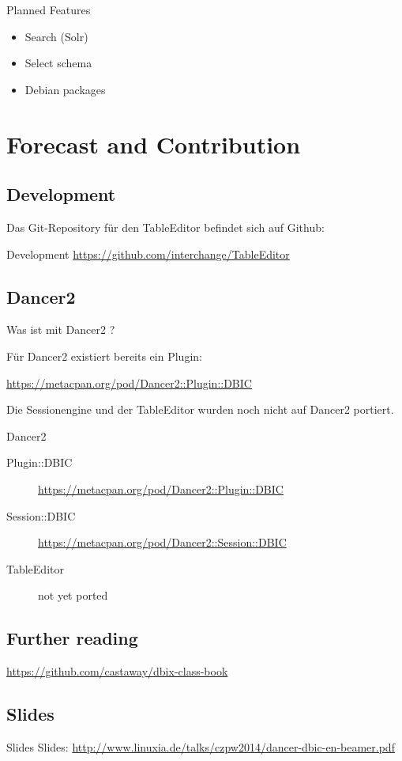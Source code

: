 \begin{frame}{Planned Features}
\begin{itemize}
\item Search (Solr)
\item Select schema
\item Debian packages
\end{itemize}
\end{frame}


\section{Forecast and Contribution}

\subsection{Development}

Das Git-Repository für den TableEditor befindet sich auf Github:

\begin{frame}{Development}
\url{https://github.com/interchange/TableEditor}
\end{frame}

\subsection{Dancer2}

Was ist mit Dancer2 ?

Für Dancer2 existiert bereits ein Plugin:

\url{https://metacpan.org/pod/Dancer2::Plugin::DBIC}

Die Sessionengine und der TableEditor wurden noch nicht auf Dancer2 portiert.

\begin{frame}{Dancer2}
  \begin{description}
  \item[Plugin::DBIC] \url{https://metacpan.org/pod/Dancer2::Plugin::DBIC}
  \item[Session::DBIC] \url{https://metacpan.org/pod/Dancer2::Session::DBIC}
  \item[TableEditor] not yet ported
  \end{description}
\end{frame}


\subsection{Further reading}

\url{https://github.com/castaway/dbix-class-book}

\subsection{Slides}

\begin{frame}{Slides}
Slides:
\url{http://www.linuxia.de/talks/czpw2014/dancer-dbic-en-beamer.pdf}
\end{frame}



